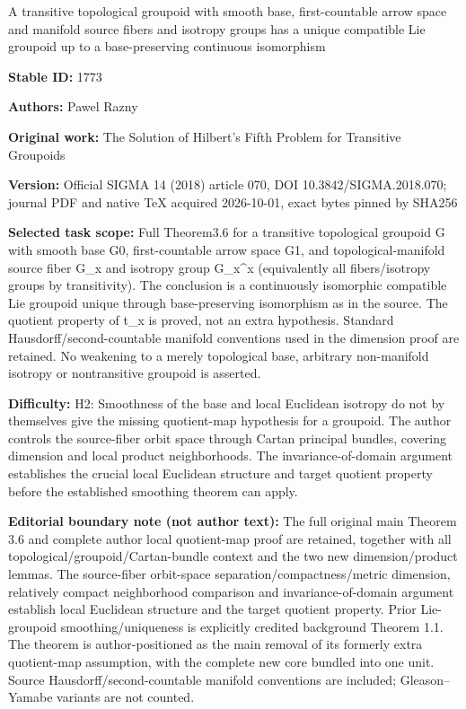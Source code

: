 \documentclass[11pt]{article}
\begin{document}
\begin{center}\Large A transitive topological groupoid with smooth base, first-countable arrow space and manifold source fibers and isotropy groups has a unique compatible Lie groupoid up to a base-preserving continuous isomorphism\end{center}
\noindent\textbf{Stable ID:} 1773\par
\noindent\textbf{Authors:} Pawel Razny\par
\noindent\textbf{Original work:} The Solution of Hilbert's Fifth Problem  for Transitive Groupoids\par
\noindent\textbf{Version:} Official SIGMA 14 (2018) article 070, DOI 10.3842/SIGMA.2018.070; journal PDF and native TeX acquired 2026-10-01, exact bytes pinned by SHA256\par
\noindent\textbf{Selected task scope:} Full Theorem3.6 for a transitive topological groupoid G with smooth base G0, first-countable arrow space G1, and topological-manifold source fiber G\_x and isotropy group G\_x\textasciicircum{}x (equivalently all fibers/isotropy groups by transitivity). The conclusion is a continuously isomorphic compatible Lie groupoid unique through base-preserving isomorphism as in the source. The quotient property of t\_x is proved, not an extra hypothesis. Standard Hausdorff/second-countable manifold conventions used in the dimension proof are retained. No weakening to a merely topological base, arbitrary non-manifold isotropy or nontransitive groupoid is asserted.\par
\noindent\textbf{Difficulty:} H2: Smoothness of the base and local Euclidean isotropy do not by themselves give the missing quotient-map hypothesis for a groupoid. The author controls the source-fiber orbit space through Cartan principal bundles, covering dimension and local product neighborhoods. The invariance-of-domain argument establishes the crucial local Euclidean structure and target quotient property before the established smoothing theorem can apply.\par
\noindent\textbf{Editorial boundary note (not author text):} The full original main Theorem 3.6 and complete author local quotient-map proof are retained, together with all topological/groupoid/Cartan-bundle context and the two new dimension/product lemmas. The source-fiber orbit-space separation/compactness/metric dimension, relatively compact neighborhood comparison and invariance-of-domain argument establish local Euclidean structure and the target quotient property. Prior Lie-groupoid smoothing/uniqueness is explicitly credited background Theorem 1.1. The theorem is author-positioned as the main removal of its formerly extra quotient-map assumption, with the complete new core bundled into one unit. Source Hausdorff/second-countable manifold conventions are included; Gleason–Yamabe variants are not counted.\par
\end{document}
